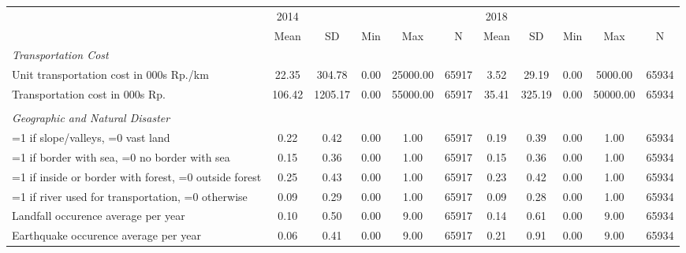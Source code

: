 \begin{tabular}{l*{2}{ccccc}}
\toprule
                &     2014&         &         &         &         &     2018&         &         &         &         \\
                &     Mean&       SD&      Min&      Max&        N&     Mean&       SD&      Min&      Max&        N\\
\midrule
\emph{Transportation Cost}&         &         &         &         &         &         &         &         &         &         \\
\hspace{0.25cm} Unit transportation cost in 000s Rp./km&    22.35&   304.78&     0.00& 25000.00&    65917&     3.52&    29.19&     0.00&  5000.00&    65934\\
\hspace{0.25cm} Transportation cost in 000s Rp.&   106.42&  1205.17&     0.00& 55000.00&    65917&    35.41&   325.19&     0.00& 50000.00&    65934\\
\vspace{0.05em} \\ \emph{Geographic and Natural Disaster}&         &         &         &         &         &         &         &         &         &         \\
\hspace{0.25cm} =1 if slope/valleys, =0 vast land&     0.22&     0.42&     0.00&     1.00&    65917&     0.19&     0.39&     0.00&     1.00&    65934\\
\hspace{0.25cm} =1 if border with sea, =0 no border with sea&     0.15&     0.36&     0.00&     1.00&    65917&     0.15&     0.36&     0.00&     1.00&    65934\\
\hspace{0.25cm} =1 if inside or border with forest, =0 outside forest&     0.25&     0.43&     0.00&     1.00&    65917&     0.23&     0.42&     0.00&     1.00&    65934\\
\hspace{0.25cm} =1 if river used for transportation, =0 otherwise&     0.09&     0.29&     0.00&     1.00&    65917&     0.09&     0.28&     0.00&     1.00&    65934\\
\hspace{0.25cm} Landfall occurence average per year&     0.10&     0.50&     0.00&     9.00&    65917&     0.14&     0.61&     0.00&     9.00&    65934\\
\hspace{0.25cm} Earthquake occurence average per year&     0.06&     0.41&     0.00&     9.00&    65917&     0.21&     0.91&     0.00&     9.00&    65934\\

\end{tabular}
